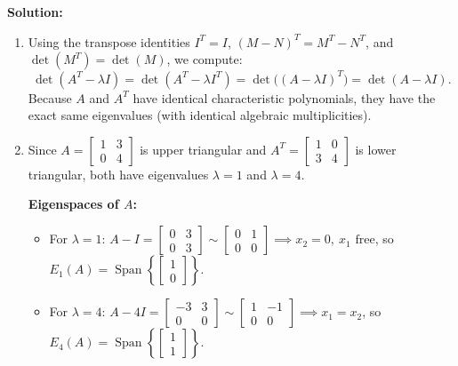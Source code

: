 \documentclass[11pt, letterpaper]{article}
\theoremstyle{definition}
\theoremstyle{remark}
\begin{document}
\textbf{Solution:}
\begin{enumerate}[label=(\alph*)]
    \item Using the transpose identities $I^T = I$, $(M - N)^T = M^T - N^T$, and $\det(M^T) = \det(M)$, we compute:
    \[
    \det(A^T - \lambda I) = \det(A^T - \lambda I^T) = \det\bigl((A - \lambda I)^T\bigr) = \det(A - \lambda I).
    \]
    Because $A$ and $A^T$ have identical characteristic polynomials, they have the exact same eigenvalues (with identical algebraic multiplicities).

    \item Since $A = \begin{bmatrix} 1 & 3 \\ 0 & 4 \end{bmatrix}$ is upper triangular and $A^T = \begin{bmatrix} 1 & 0 \\ 3 & 4 \end{bmatrix}$ is lower triangular, both have eigenvalues $\lambda = 1$ and $\lambda = 4$.

    \textbf{Eigenspaces of $A$:}
    \begin{itemize}
        \item For $\lambda = 1$: $A - I = \begin{bmatrix} 0 & 3 \\ 0 & 3 \end{bmatrix} \sim \begin{bmatrix} 0 & 1 \\ 0 & 0 \end{bmatrix} \implies x_2 = 0,\ x_1 \text{ free}$, so $E_1(A) = \operatorname{Span}\left\{ \begin{bmatrix} 1 \\ 0 \end{bmatrix} \right\}$.
        \item For $\lambda = 4$: $A - 4I = \begin{bmatrix} -3 & 3 \\ 0 & 0 \end{bmatrix} \sim \begin{bmatrix} 1 & -1 \\ 0 & 0 \end{bmatrix} \implies x_1 = x_2$, so $E_4(A) = \operatorname{Span}\left\{ \begin{bmatrix} 1 \\ 1 \end{bmatrix} \right\}$.
    \end{itemize}


\end{enumerate}
\end{document}
